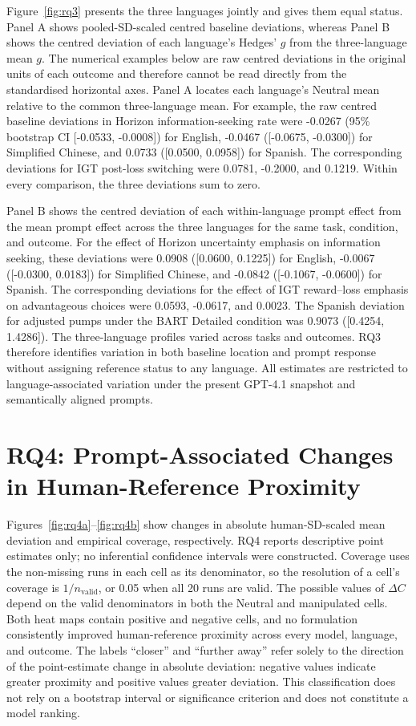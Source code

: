 \documentclass[logo,msc]{infthesis}
\begin{document}
Figure~\ref{fig:rq3} presents the three languages jointly and gives them equal status. Panel A shows pooled-SD-scaled centred baseline deviations, whereas Panel B shows the centred deviation of each language's Hedges' \(g\) from the three-language mean \(g\). The numerical examples below are raw centred deviations in the original units of each outcome and therefore cannot be read directly from the standardised horizontal axes. Panel A locates each language's Neutral mean relative to the common three-language mean. For example, the raw centred baseline deviations in Horizon information-seeking rate were -0.0267 (95\% bootstrap CI [-0.0533, -0.0008]) for English, -0.0467 ([-0.0675, -0.0300]) for Simplified Chinese, and 0.0733 ([0.0500, 0.0958]) for Spanish. The corresponding deviations for IGT post-loss switching were 0.0781, -0.2000, and 0.1219. Within every comparison, the three deviations sum to zero.

Panel B shows the centred deviation of each within-language prompt effect from the mean prompt effect across the three languages for the same task, condition, and outcome. For the effect of Horizon uncertainty emphasis on information seeking, these deviations were 0.0908 ([0.0600, 0.1225]) for English, -0.0067 ([-0.0300, 0.0183]) for Simplified Chinese, and -0.0842 ([-0.1067, -0.0600]) for Spanish. The corresponding deviations for the effect of IGT reward--loss emphasis on advantageous choices were 0.0593, -0.0617, and 0.0023. The Spanish deviation for adjusted pumps under the BART Detailed condition was 0.9073 ([0.4254, 1.4286]). The three-language profiles varied across tasks and outcomes. RQ3 therefore identifies variation in both baseline location and prompt response without assigning reference status to any language. All estimates are restricted to language-associated variation under the present GPT-4.1 snapshot and semantically aligned prompts.

\section{RQ4: Prompt-Associated Changes in Human-Reference Proximity}

Figures~\ref{fig:rq4a}--\ref{fig:rq4b} show changes in absolute human-SD-scaled mean deviation and empirical coverage, respectively. RQ4 reports descriptive point estimates only; no inferential confidence intervals were constructed. Coverage uses the non-missing runs in each cell as its denominator, so the resolution of a cell's coverage is \(1/n_{\mathrm{valid}}\), or 0.05 when all 20 runs are valid. The possible values of \(\Delta C\) depend on the valid denominators in both the Neutral and manipulated cells. Both heat maps contain positive and negative cells, and no formulation consistently improved human-reference proximity across every model, language, and outcome. The labels ``closer'' and ``further away'' refer solely to the direction of the point-estimate change in absolute deviation: negative values indicate greater proximity and positive values greater deviation. This classification does not rely on a bootstrap interval or significance criterion and does not constitute a model ranking.
\end{document}

